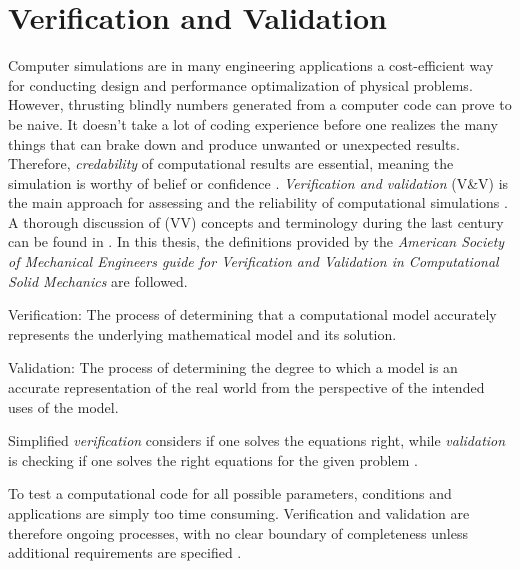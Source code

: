 \chapter{Verification and Validation}
 Computer simulations are in many engineering applications a cost-efficient way for conducting design and performance optimalization of physical problems. However, thrusting blindly numbers generated from a computer code can prove to be naive. It doesn't take a lot of coding experience before one realizes the many things that can brake down and produce unwanted or unexpected results. 
Therefore, \textit{credability} of computational results are essential, meaning the simulation is worthy of belief or confidence \cite{Oberkampf2010}.
 \textit{Verification and validation} (V&V) is the main approach for assessing and the reliability of computational simulations \cite{Sommerville2006}.  A thorough discussion  of (VV) concepts and terminology during the last century can be found in \cite{Oberkampf2010}. In this thesis, the definitions provided by the \textit{American Society of Mechanical Engineers guide for Verification and Validation in Computational Solid Mechanics}  \cite{Schwer2006} are followed.

\begin{defn}
Verification: The process of determining that a computational model accurately represents
the underlying mathematical model and its solution. 
\end{defn}

\begin{defn}
Validation: The process of determining the degree to which a model is an accurate
representation of the real world from the perspective of the intended uses of the model. 
\end{defn}

Simplified \textit{verification} considers if one solves the equations right, while \textit{validation} is checking if one solves the right equations for the given problem \cite{Roache}.

 To test a computational code for all possible parameters, conditions and applications are simply too time consuming.   Verification and validation are therefore ongoing processes, with no clear boundary of completeness unless additional requirements are specified \cite{Roache}.



